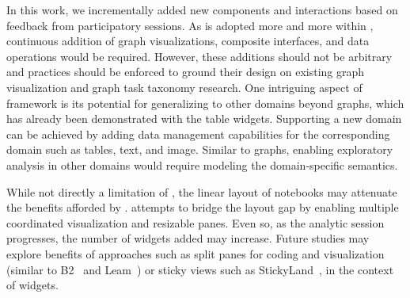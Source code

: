 
 In this work, we incrementally added new components and interactions based on feedback from participatory sessions. As \system is adopted more and more within \company, continuous addition of graph visualizations, composite interfaces, and data operations would be required. However, these additions should not be arbitrary and practices should be enforced to ground their design on existing graph visualization and graph task taxonomy research. One intriguing aspect of \system framework is its potential for generalizing to other domains beyond graphs, which has already been demonstrated with the table widgets. Supporting a new domain can be achieved by adding data management capabilities for the corresponding domain such as tables, text, and image. Similar to graphs, enabling exploratory analysis in other domains would require modeling the domain-specific semantics. 

While not directly a limitation of \system, the linear layout of notebooks may attenuate the benefits afforded by \system. \system attempts to bridge the layout gap by enabling multiple coordinated visualization and resizable panes. Even so, as the analytic session progresses, the number of widgets added may increase. Future studies may explore benefits of approaches such as split panes for coding and visualization (similar to B2~\cite{wu2020b2} and Leam~\cite{rahman2020leam}) or sticky views such as StickyLand~\cite{wang2022stickyland}, in the context of \system widgets.

